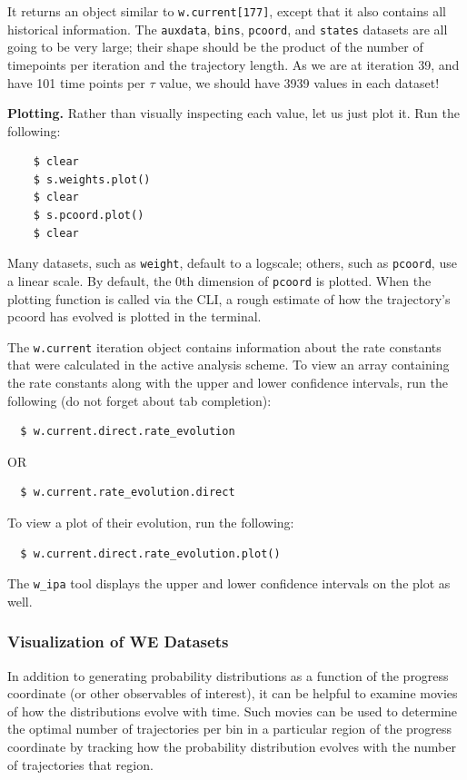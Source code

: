 It returns an object similar to \verb|w.current[177]|, except that it also contains all historical information. 
The \verb|auxdata|, \verb|bins|, \verb|pcoord|, and \verb|states| datasets are all going to be very large; their shape should be the product of the number of timepoints per iteration and the trajectory length. 
As we are at iteration 39, and have 101 time points per $\tau$ value, we should have 3939 values in each dataset! 

\textbf{Plotting.} Rather than visually inspecting each value, let us just plot it. 
Run the following:
\begin{verbatim}
    $ clear
    $ s.weights.plot()
    $ clear
    $ s.pcoord.plot()
    $ clear
\end{verbatim}


Many datasets, such as \verb|weight|, default to a logscale; others, such as \verb|pcoord|, use a linear scale. 
By default, the 0th dimension of \verb|pcoord| is plotted. 
When the plotting function is called via the CLI, a rough estimate of how the trajectory’s pcoord has evolved is plotted in the terminal.

The \verb|w.current| iteration object contains information about the rate constants that were calculated in the active analysis scheme. 
To view an array containing the rate constants along with the upper and lower confidence intervals, run the following (do not forget about tab completion): 
\begin{verbatim}
  $ w.current.direct.rate_evolution
\end{verbatim}
OR
\begin{verbatim}
  $ w.current.rate_evolution.direct
\end{verbatim}

\noindent To view a plot of their evolution, run the following:
\begin{verbatim}
  $ w.current.direct.rate_evolution.plot()
\end{verbatim}

The \verb|w_ipa| tool displays the upper and lower confidence intervals on the plot as well. 

\subsubsection{Visualization of WE Datasets}
\label{tut:analysis_adv_visualization}

In addition to generating probability distributions as a function of the progress coordinate (or other observables of interest), it can be helpful to examine movies of how the distributions evolve with time. 
Such movies can be used to determine the optimal number of trajectories per bin in a particular region of the progress coordinate by tracking how the probability distribution evolves with the number of trajectories that region. 

